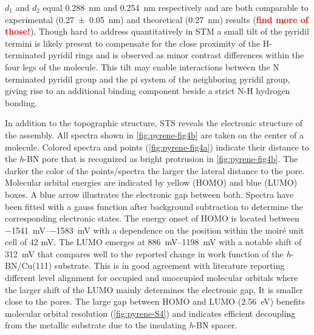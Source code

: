 $d_1$ and $d_2$ equal \SI{0.288}{\nano \meter} and \SI{0.254}{\nano \meter} respectively and are both comparable to experimental\cite[5]{Kaposi_Supramolecular_2016} (\SI{0.27 \pm 0.05}{\nano \meter}) and theoretical\cite[5]{Arras_Nature_2012} (\SI{0.27}{\nano \meter}) results (\textcolor{red}{\textbf{find more of those!}}). Though hard to address quantitatively in STM a small tilt of the pyridil termini is likely present to compensate for the close proximity of the H-terminated pyridil rings and is observed as minor contrast differences within the four legs of the molecule. This tilt may enable interactions between the N terminated pyridil group and the pi system of the neighboring pyridil group, giving rise to an additional binding component beside a strict N-H hydrogen bonding.

In addition to the topographic structure, STS reveals the electronic structure of the assembly. All spectra shown in \autoref{fig:pyrene-fig4b} are taken on the center of a molecule. Colored spectra and points (\autoref{fig:pyrene-fig4a}) indicate their distance to the \textit{h}-BN pore that is recognized as bright protrusion in \autoref{fig:pyrene-fig4b}. The darker the color of the points/spectra the larger the lateral distance to the pore. Molecular orbital energies are indicated by yellow (HOMO) and blue (LUMO) boxes. A blue arrow illustrates the electronic gap between both. Spectra have been fitted with a gauss function after background subtraction to determine the corresponding electronic states. The energy onset of HOMO is located between \SIrange{-1541}{-1583}{\milli \volt} with a dependence on the position within the moir\'e unit cell of 42 mV. The LUMO emerges at 
\SIrange{886}{1198}{\milli \volt}
with a notable shift of \SI{312}{\milli \volt} that compares well to the reported change in work function of the \textit{h}-BN/Cu(111) substrate.\cite{Sushobhan_Control_2014,Liu_Interplay_2015,Schulz_Templated_2013,urgel_controlling_2015} This is in good agreement with literature reporting different level alignment for occupied and unoccupied molecular orbitals where the larger shift of the LUMO mainly determines the electronic gap. It is smaller close to the pores.\cite{Kumar_Molecular_2017} The large gap between HOMO and LUMO (\SI{2.56}{\eV}) benefits molecular orbital resolution (\autoref{fig:pyrene-S4}) and indicates efficient decoupling from the metallic substrate due to the insulating \textit{h}-BN spacer. 


